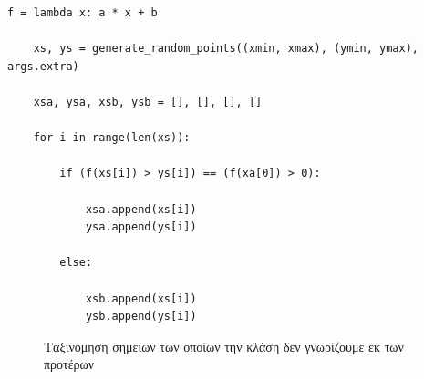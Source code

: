 \documentclass[12pt]{article}
\begin{document}
\pagebreak

\begin{lstlisting}[caption={Η υλοποίηση της ταξινόμησης βάσει του προσήμου της παράστασης \( a^{T} \cdot x - b \)}]
    f = lambda x: a * x + b

    xs, ys = generate_random_points((xmin, xmax), (ymin, ymax), args.extra)

    xsa, ysa, xsb, ysb = [], [], [], []

    for i in range(len(xs)):

        if (f(xs[i]) > ys[i]) == (f(xa[0]) > 0):

            xsa.append(xs[i])
            ysa.append(ys[i])

        else:

            xsb.append(xs[i])
            ysb.append(ys[i])
\end{lstlisting}

\begin{figure}[hp]
    \centering
    \qquad
    \caption{Ταξινόμηση σημείων των οποίων την κλάση δεν γνωρίζουμε εκ των προτέρων}
\end{figure}
\end{document}
